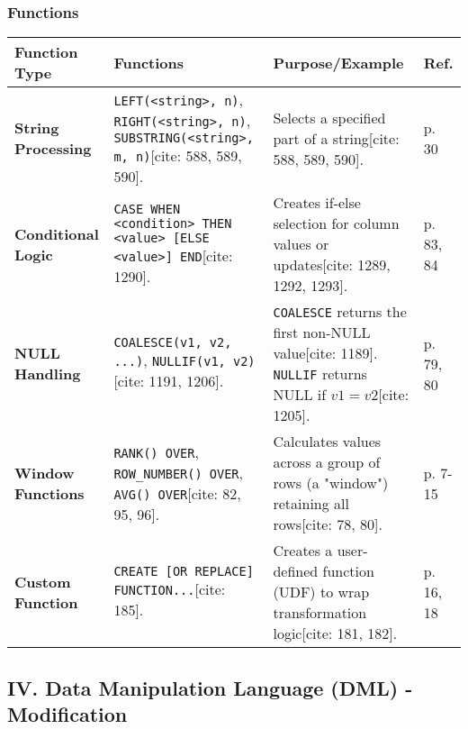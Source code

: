 \documentclass[12pt,a4paper]{article}
\begin{document}
\vspace{0.5cm}

\subsubsection*{Functions}
\begin{longtable}{>{\bfseries}p{} p{} p{} p{}}
\toprule
\textbf{Function Type} & \textbf{Functions} & \textbf{Purpose/Example} & \textbf{Ref.} \\
\midrule
\endhead
\textbf{String Processing} & \texttt{LEFT(\textless string\textgreater, n)}, \texttt{RIGHT(\textless string\textgreater, n)}, \texttt{SUBSTRING(\textless string\textgreater, m, n)}[cite: 588, 589, 590]. & Selects a specified part of a string[cite: 588, 589, 590]. & p. 30 \\
\textbf{Conditional Logic} & \texttt{CASE WHEN \textless condition\textgreater\ THEN \textless value\textgreater\ [ELSE \textless value\textgreater] END}[cite: 1290]. & Creates if-else selection for column values or updates[cite: 1289, 1292, 1293]. & p. 83, 84 \\
\textbf{NULL Handling} & \texttt{COALESCE(v1, v2, ...)}, \texttt{NULLIF(v1, v2)}[cite: 1191, 1206]. & \texttt{COALESCE} returns the first non-NULL value[cite: 1189]. \texttt{NULLIF} returns NULL if $v1=v2$[cite: 1205]. & p. 79, 80 \\
\textbf{Window Functions} & \texttt{RANK() OVER}, \texttt{ROW\_NUMBER() OVER}, \texttt{AVG() OVER}[cite: 82, 95, 96]. & Calculates values across a group of rows (a "window") retaining all rows[cite: 78, 80]. & p. 7-15 \\
\textbf{Custom Function} & \texttt{CREATE [OR REPLACE] FUNCTION...}[cite: 185]. & Creates a user-defined function (UDF) to wrap transformation logic[cite: 181, 182]. & p. 16, 18 \\
\bottomrule
\end{longtable}

\vspace{0.5cm}

\subsection*{IV. Data Manipulation Language (DML) - Modification}
\end{document}

